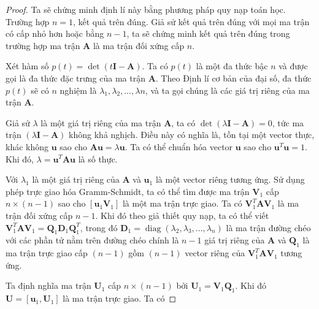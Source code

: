 \documentclass[12pt,a4paper,oneside]{report}
\numberwithin{equation}{section}
\begin{document}
\begin{proof}
 Ta sẽ chứng minh định lí này bằng phương pháp quy nạp toán học. Trường hợp $n=1$, kết quả trên đúng. Giả sử kết quả trên đúng với mọi ma trận có cấp nhỏ hơn hoặc bằng $n-1$, ta sẽ chứng minh kết quả trên đúng trong trường hợp ma trận $\mathbf{A}$ là ma trận đối xứng cấp $n$.
	
	Xét hàm số $p(t)=\operatorname{det}(t \mathbf{I}-\mathbf{A})$. Ta có $p(t)$ là một đa thức bậc $n$ và được gọi là đa thức đặc trưng của ma trận $\mathbf{A}$. Theo Định lí cơ bản của đại số, đa thức $p(t)$ sẽ có $n$ nghiệm là $\lambda_{1}, \lambda_{2}, \ldots, \lambda n$, và ta gọi chúng là các giá trị riêng của ma trận $\mathbf{A}$.
	
	Giả sử $\lambda$ là một giá trị riêng của ma trận $\mathbf{A}$, ta có $\operatorname{det}(\lambda \mathbf{I}-\mathbf{A})=0$, tức ma trận $(\lambda \mathbf{I}-\mathbf{A})$ không khả nghịch. Điều này có nghĩa là, tồn tại một vector thực, khác không $\mathbf{u}$ sao cho $\mathbf{A} \mathbf{u}=\lambda \mathbf{u}$. Ta có thể chuẩn hóa vector $\mathbf{u}$ sao cho $\mathbf{u}^{T} \mathbf{u}=1$. Khi đó, $\lambda=\mathbf{u}^{T} \mathbf{A u}$ là số thực.
	
	Với $\lambda_{1}$ là một giá trị riêng của $\mathbf{A}$ và $\mathbf{u}_{1}$ là một vector riêng tương ứng. Sử dụng phép trực giao hóa Gramm-Schmidt, ta có thể tìm được ma trận $\mathbf{V}_{1}$ cấp $n \times(n-1)$ sao cho $\left[\mathbf{u}_{1} \mathbf{V}_{1}\right]$ là một ma trận trực giao. Ta có $\mathbf{V}_{1}^{T} \mathbf{A} \mathbf{V}_{1}$ là ma trận đối xứng cấp $n-1$. Khi đó theo giả thiết quy nạp, ta có thể viết $\mathbf{V}_{1}^{T} \mathbf{A} \mathbf{V}_{1}=\mathbf{Q}_{1} \mathbf{D}_{1} \mathbf{Q}_{1}^{T}$, trong đó $\mathbf{D}_{1}=\operatorname{diag}\left(\lambda_{2}, \lambda_{3}, \ldots, \lambda_{n}\right)$ là ma trận đường chéo với các phần tử nằm trên đường chéo chính là $n-1$ giá trị riêng của $\mathbf{A}$ và $\mathbf{Q}_{1}$ là ma trận trực giao cấp $(n-1)$ gồm $(n-1)$ vector riêng của $\mathbf{V}_{1}^{T} \mathbf{A} \mathbf{V}_{1}$ tương ứng.
	
	Ta định nghĩa ma trận $\mathbf{U}_{1}$ cấp $n \times(n-1)$ bởi $\mathbf{U}_{1}=\mathbf{V}_{1} \mathbf{Q}_{1}$. Khi đó $\mathbf{U}=\left[\mathbf{u}_{1}, \mathbf{U}_{1}\right]$ là ma trận trực giao. Ta có
	

\end{proof}
\end{document}
